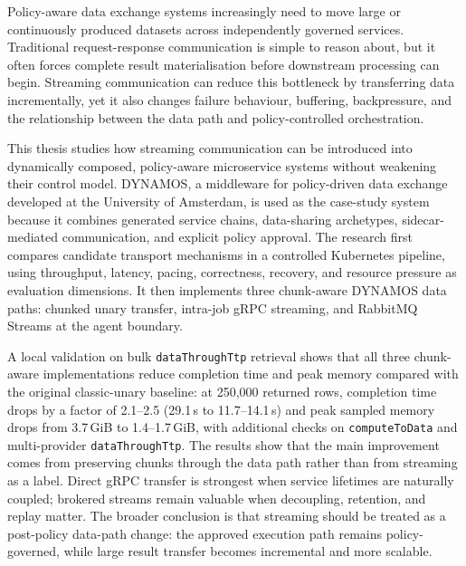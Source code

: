 Policy-aware data exchange systems increasingly need to move large or continuously produced datasets across independently governed services. Traditional request-response communication is simple to reason about, but it often forces complete result materialisation before downstream processing can begin. Streaming communication can reduce this bottleneck by transferring data incrementally, yet it also changes failure behaviour, buffering, backpressure, and the relationship between the data path and policy-controlled orchestration.

This thesis studies how streaming communication can be introduced into dynamically composed, policy-aware microservice systems without weakening their control model. DYNAMOS, a middleware for policy-driven data exchange developed at the University of Amsterdam, is used as the case-study system because it combines generated service chains, data-sharing archetypes, sidecar-mediated communication, and explicit policy approval. The research first compares candidate transport mechanisms in a controlled Kubernetes pipeline, using throughput, latency, pacing, correctness, recovery, and resource pressure as evaluation dimensions. It then implements three chunk-aware DYNAMOS data paths: chunked unary transfer, intra-job gRPC streaming, and RabbitMQ Streams at the agent boundary.

A local validation on bulk \texttt{dataThroughTtp} retrieval shows that all three chunk-aware implementations reduce completion time and peak memory compared with the original classic-unary baseline: at 250{,}000 returned rows, completion time drops by a factor of 2.1--2.5 (29.1\,s to 11.7--14.1\,s) and peak sampled memory drops from 3.7\,GiB to 1.4--1.7\,GiB, with additional checks on \texttt{computeToData} and multi-provider \texttt{dataThroughTtp}. The results show that the main improvement comes from preserving chunks through the data path rather than from streaming as a label. Direct gRPC transfer is strongest when service lifetimes are naturally coupled; brokered streams remain valuable when decoupling, retention, and replay matter. The broader conclusion is that streaming should be treated as a post-policy data-path change: the approved execution path remains policy-governed, while large result transfer becomes incremental and more scalable.
